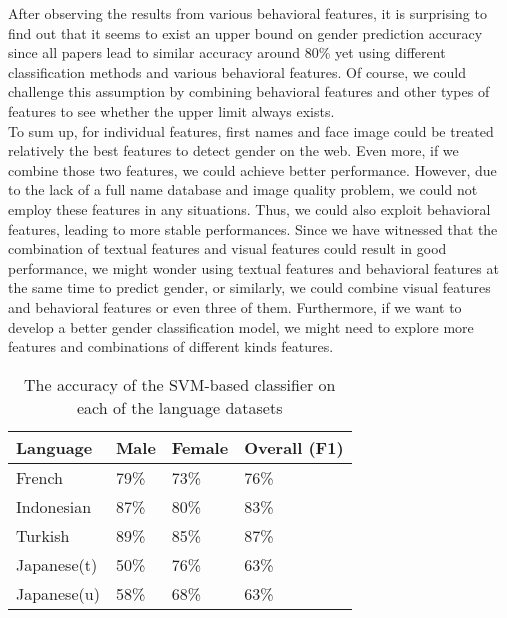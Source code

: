 \documentclass[runningheads]{llncs}
\begin{document}
	After observing the results from various behavioral features, it is surprising to find out that it seems to exist an upper bound on gender prediction accuracy since all papers lead to similar accuracy around 80\% yet using different classification methods and various behavioral features. Of course, we could challenge this assumption by combining behavioral features and other types of features to see whether the upper limit always exists. \\
	
	To sum up, for individual features, first names and face image could be treated relatively the best features to detect gender on the web. Even more, if we combine those two features, we could achieve better performance. However, due to the lack of a full name database and image quality problem, we could not employ these features in any situations. Thus, we could also exploit behavioral features, leading to more stable performances. Since we have witnessed that the combination of textual features and visual features could result in good performance, we might wonder using textual features and behavioral features at the same time to predict gender, or similarly, we could combine visual features and behavioral features or even three of them. Furthermore, if we want to develop a better gender classification model, we might need to explore more features and combinations of different kinds features.
	
	\begin{table}
		\centering
		\caption{The accuracy of the SVM-based classifier on each of the language datasets }
		\begin{tabular}{| x{2cm} | x{2cm} | x{2cm} | x{2cm} |}
			\hline
			Language  &  Male  & Female & Overall (F1)\\
			\hline
			French & 79\% & 73\% & 76\% \\
			Indonesian & 87\% & 80\% & 83\% \\
			Turkish & 89\% & 85\% & 87\% \\
			Japanese(t) & 50\% & 76\% & 63\% \\
			Japanese(u) & 58\% & 68\% & 63\% \\
			\hline
		\end{tabular}
		\label{table:language}
	\end{table}
	
	
	
	\newpage
	
	
	
	
\end{document}
